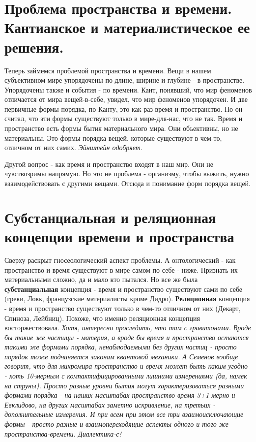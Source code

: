 \section{ Проблема пространства и времени. Кантианское и материалистическое ее решения.}
Теперь займемся проблемой пространства и времени. Вещи в нашем субъективном мире упорядочены по длине, ширине и глубине - в пространстве. Упорядочены также и события - по времени. Кант, понявший, что мир феноменов отличается от мира вещей-в-себе, увидел, что мир феноменов упорядочен. И две первичные формы порядка, по Канту, это как раз время и пространство. Но он считал, что эти формы существуют только в мире-для-нас, что не так. Время и пространство есть формы бытия материального мира. Они объективны, но не материальны. Это формы порядка вещей, которые существуют в чем-то, отличном от них самих. \textit{Эйнштейн одобряет}.

Другой вопрос - как время и пространство входят в наш мир. Они не чувствозримы напрямую. Но это не проблема - организму, чтобы выжить, нужно взаимодействовать с другими вещами. Отсюда и понимание форм порядка вещей.

\section{ Субстанциальная и реляционная концепции времени и пространства}
Сверху раскрыт гносеологический аспект проблемы. А онтологический - как пространство и время существуют в мире самом по себе - ниже. Признать их материальными сложно, да и мало кто пытался. Но все же была \textbf{субстанциальная} концепция - время и пространство существуют сами по себе (греки, Локк, французские материалисты кроме Дидро). \textbf{Реляционная} концепция - время и пространство существуют только в чем-то отличном от них (Декарт, Спиноза, Лейбниц). Похоже, что именно реляционная концепция восторжествовала. \textit{Хотя, интересно проследить, что там с гравитонами. Вроде бы такие же частицы - материя, а вроде бы время и пространство остаются такими же формами порядка, ненаблюдаемыми без других частиц - просто порядок тоже подчиняется законам квантовой механики. А Семенов вообще говорит, что для микромира пространство и время  может быть каким угодно - хоть 10-мерным с компактифицированными лишними измерениями (да, намек на струны). Просто разные уровни бытия могут характеризоваться разными формами порядка - на наших масштабах пространство-время 3+1-мерно и Евклидово, на других масштабах заметно искривление, на третьих - дополнительные измерения. И при всем при этом все три взаимоисключающие формы - просто разные и взаимопереходящие аспекты одного и того же пространства-времени. Диалектика-с!}


